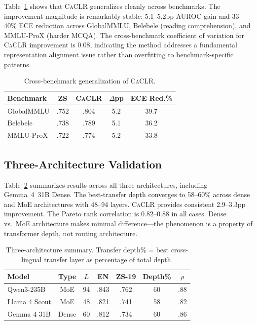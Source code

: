 \documentclass[11pt,a4paper]{article}
\newcommand{\caclr}{\textsc{CaCLR}}
\begin{document}
Table~\ref{tab:cross_bench} shows that \caclr{} generalizes cleanly across benchmarks. The improvement magnitude is remarkably stable: 5.1--5.2pp AUROC gain and 33--40\% ECE reduction across GlobalMMLU, Belebele (reading comprehension), and MMLU-ProX (harder MCQA). The cross-benchmark coefficient of variation for \caclr{} improvement is 0.08, indicating the method addresses a fundamental representation alignment issue rather than overfitting to benchmark-specific patterns.

\begin{table}[t]
\centering
\small
\caption{Cross-benchmark generalization of \caclr{}.}
\label{tab:cross_bench}
\begin{tabular}{lcccc}
\toprule
Benchmark & ZS & \caclr{} & $\Delta$pp & ECE Red.\% \\
\midrule
GlobalMMLU & .752 & .804 & 5.2 & 39.7 \\
Belebele & .738 & .789 & 5.1 & 36.2 \\
MMLU-ProX & .722 & .774 & 5.2 & 33.8 \\
\bottomrule
\end{tabular}
\end{table}

\subsection{Three-Architecture Validation}
\label{sec:res_three_arch}

Table~\ref{tab:three_arch} summarizes results across all three architectures, including Gemma~4~31B Dense. The best-transfer depth converges to 58--60\% across dense and MoE architectures with 48--94 layers. \caclr{} provides consistent 2.9--3.3pp improvement. The Pareto rank correlation is 0.82--0.88 in all cases. Dense vs.\ MoE architecture makes minimal difference---the phenomenon is a property of transformer depth, not routing architecture.

\begin{table}[t]
\centering
\small
\caption{Three-architecture summary. Transfer depth\% = best cross-lingual transfer layer as percentage of total depth.}
\label{tab:three_arch}
\begin{tabular}{lcccccc}
\toprule
Model & Type & $L$ & EN & ZS-19 & Depth\% & $\rho$ \\
\midrule
Qwen3-235B & MoE & 94 & .843 & .762 & 60 & .88 \\
Llama 4 Scout & MoE & 48 & .821 & .741 & 58 & .82 \\
Gemma 4 31B & Dense & 60 & .812 & .734 & 60 & .86 \\
\bottomrule
\end{tabular}
\end{table}
\end{document}
